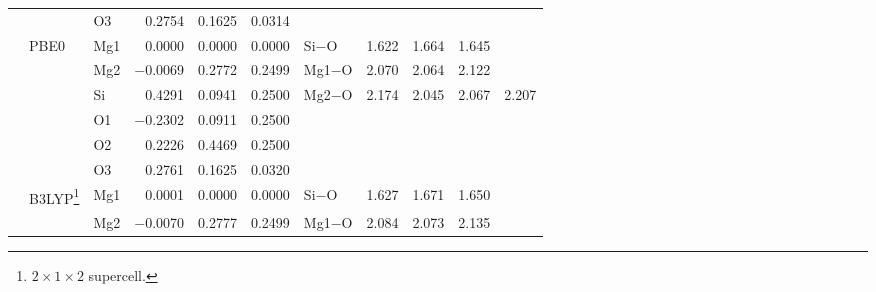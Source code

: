 \documentclass[pra,twocolumn,twocolumngrid,superbib]{revtex4} %
\begin{document}
\begin{table}[t]
\begin{tabular}{lllrrrlcccc}
    &        & O3  &     0.2754 & 0.1625 & 0.0314 &         &       &       &       & \\%
    & PBE0   & Mg1 &    0.0000 & 0.0000 & 0.0000 & Si$-$O  & 1.622 & 1.664 & 1.645 & \\%
    &        & Mg2 & $-$0.0069 & 0.2772 & 0.2499 & Mg1$-$O & 2.070 & 2.064 & 2.122 & \\%
    &        & Si  &    0.4291 & 0.0941 & 0.2500 & Mg2$-$O & 2.174 & 2.045 & 2.067 & 2.207 \\%
    &        & O1  & $-$0.2302 & 0.0911 & 0.2500 &         &       &       &       & \\%
    &        & O2  &    0.2226 & 0.4469 & 0.2500 &         &       &       &       & \\%
    &        & O3  &    0.2761 & 0.1625 & 0.0320 &         &       &       &       & \\%
    & B3LYP\footnote[2]{$2\times 1\times 2$ supercell.} %
             & Mg1 &    0.0001 & 0.0000 & 0.0000 & Si$-$O  & 1.627 & 1.671 & 1.650 & \\%
    &        & Mg2 & $-$0.0070 & 0.2777 & 0.2499 & Mg1$-$O & 2.084 & 2.073 & 2.135 & \\%

\end{tabular}
\end{table}
\end{document}
